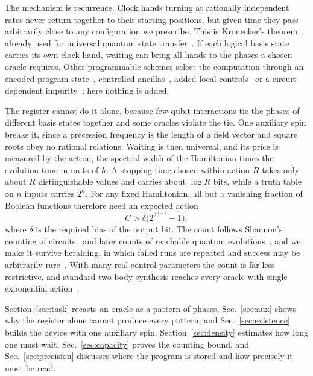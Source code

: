 \documentclass[11pt,a4paper]{article}
\begin{document}
The mechanism is recurrence. Clock hands turning at rationally independent rates never return together to their starting positions, but given time they pass arbitrarily close to any configuration we prescribe. This is Kronecker's theorem~\cite{Weyl1916}, already used for universal quantum state transfer~\cite{Cameron2014}. If each logical basis state carries its own clock hand, waiting can bring all hands to the phases a chosen oracle requires. Other programmable schemes select the computation through an encoded program state~\cite{Bohdanowicz2017}, controlled ancillas~\cite{Proctor2013,Proctor2014}, added local controls~\cite{Junge2026} or a circuit-dependent impurity~\cite{Pham2026}; here nothing is added.

The register cannot do it alone, because few-qubit interactions tie the phases of different basis states together and some oracles violate the tie. One auxiliary spin breaks it, since a precession frequency is the length of a field vector and square roots obey no rational relations. Waiting is then universal, and its price is measured by the action, the spectral width of the Hamiltonian times the evolution time in units of $\hbar$. A stopping time chosen within action $R$ takes only about $R$ distinguishable values and carries about $\log R$ bits, while a truth table on $n$ inputs carries $2^n$. For any fixed Hamiltonian, all but a vanishing fraction of Boolean functions therefore need an expected action
\begin{equation*}
 C>\delta\bigl(2^{2^{n-1}}-1\bigr),
\end{equation*}
where $\delta$ is the required bias of the output bit. The count follows Shannon's counting of circuits~\cite{Shannon1949} and later counts of reachable quantum evolutions~\cite{Poulin2011,Caro2022}, and we make it survive heralding, in which failed runs are repeated and success may be arbitrarily rare~\cite{Combes2015}. With many real control parameters the count is far less restrictive, and standard two-body synthesis reaches every oracle with single exponential action~\cite{Barenco1995,Nie2026}.

Section~\ref{sec:task} recasts an oracle as a pattern of phases, Sec.~\ref{sec:aux} shows why the register alone cannot produce every pattern, and Sec.~\ref{sec:existence} builds the device with one auxiliary spin. Section~\ref{sec:density} estimates how long one must wait, Sec.~\ref{sec:capacity} proves the counting bound, and Sec.~\ref{sec:precision} discusses where the program is stored and how precisely it must be read.
\end{document}
